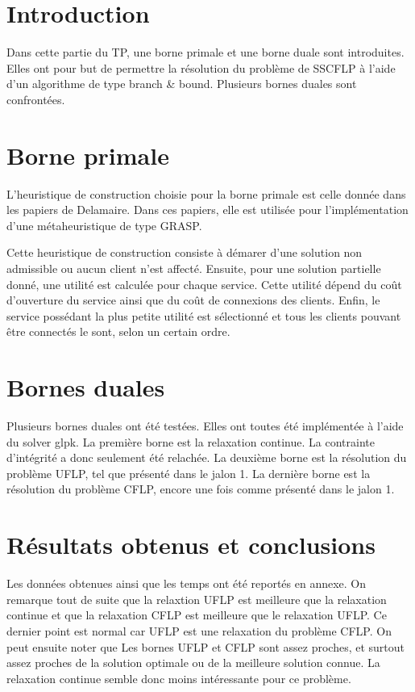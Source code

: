 \section{Introduction}

Dans cette partie du TP, une borne primale et une borne duale sont introduites.
Elles ont pour but de permettre la résolution du problème de SSCFLP à l'aide d'un algorithme de type branch \& bound.
Plusieurs bornes duales sont confrontées.

\section{Borne primale}

L'heuristique de construction choisie pour la borne primale est celle donnée dans les papiers de Delamaire.
Dans ces papiers, elle est utilisée pour l'implémentation d'une métaheuristique de type GRASP. \newline

Cette heuristique de construction consiste à démarer d'une solution non admissible ou aucun client n'est affecté.
Ensuite, pour une solution partielle donné, une utilité est calculée pour chaque service.
Cette utilité dépend du coût d'ouverture du service ainsi que du coût de connexions des clients.
Enfin, le service possédant la plus petite utilité est sélectionné et tous les clients pouvant être connectés le sont, selon un certain ordre.

\section{Bornes duales}

Plusieurs bornes duales ont été testées. Elles ont toutes été implémentée à l'aide du solver glpk.
La première borne est la relaxation continue. La contrainte d'intégrité a donc seulement été relachée.
La deuxième borne est la résolution du problème UFLP, tel que présenté dans le jalon 1.
La dernière borne est la résolution du problème CFLP, encore une fois comme présenté dans le jalon 1.

\section{Résultats obtenus et conclusions}

Les données obtenues ainsi que les temps ont été reportés en annexe.
On remarque tout de suite que la relaxtion UFLP est meilleure que la relaxation continue et que la relaxation CFLP est meilleure que le relaxation UFLP.
Ce dernier point est normal car UFLP est une relaxation du problème CFLP.
On peut ensuite noter que Les bornes UFLP et CFLP sont assez proches, et surtout assez proches de la solution optimale ou de la meilleure solution connue.
La relaxation continue semble donc moins intéressante pour ce problème. \newline

